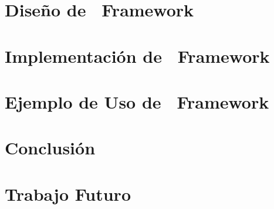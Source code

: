 \documentclass{report}
\begin{document}
        \chapter{Diseño de \nombreFramework \ Framework}
        	\label{cap:diseno_framework}
        	
            
            
            
            
            
        \chapter{Implementación de \nombreFramework \ Framework}
            
       	\chapter{Ejemplo de Uso de \nombreFramework \ Framework}
        	
        \chapter{Conclusión}
            
        \chapter{Trabajo Futuro}
            
    
	
\end{document}
